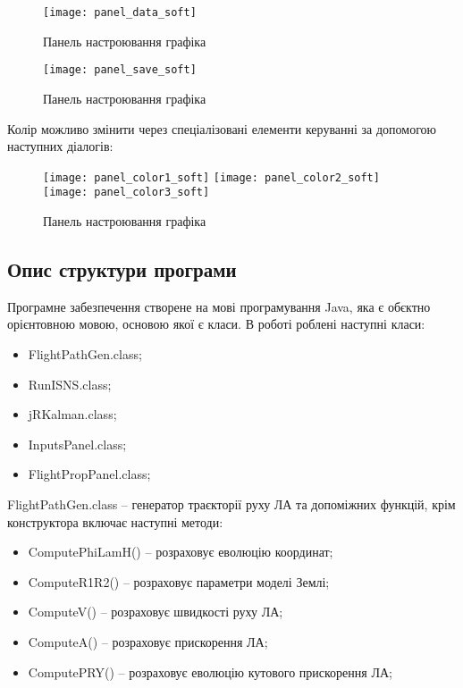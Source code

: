 \begin{figure}[h!]
\centering
\texttt{[image: panel\_data\_soft]}
\caption{Панель настроювання графіка}\label{fig:panel_data_soft}
\end{figure}

\begin{figure}[H]
\centering
\texttt{[image: panel\_save\_soft]}
\caption{Панель настроювання графіка}\label{fig:panel_save_soft}
\end{figure}
Колір можливо змінити через спеціалізовані елементи керуванні за допомогою наступних діалогів: 
\begin{figure}[H]
\centering
\texttt{[image: panel\_color1\_soft]}
\texttt{[image: panel\_color2\_soft]}
\texttt{[image: panel\_color3\_soft]}
\caption{Панель настроювання графіка}\label{fig:panel_color_soft}
\end{figure}

\subsection{Опис структури програми}

Програмне забезпечення створене на мові програмування Java, яка є обєктно орієнтовною мовою, основою якої є класи. В роботі роблені наступні класи:
\begin{itemize}
 \item FlightPathGen.class;
 \item RunISNS.class;
 \item jRKalman.class;
 \item InputsPanel.class;
 \item FlightPropPanel.class;
\end{itemize}

FlightPathGen.class -- генератор траєкторії руху ЛА та допоміжних функцій, крім конструктора включає наступні методи:

\begin{itemize}
 \item ComputePhiLamH() -- розраховує еволюцію координат;
 \item ComputeR1R2() -- розраховує параметри моделі Землі;
 \item ComputeV() -- розраховує швидкості руху ЛА;
 \item ComputeA() -- розраховує прискорення ЛА;
 \item ComputePRY() -- розраховує еволюцію кутового прискорення ЛА;
\end{itemize}

